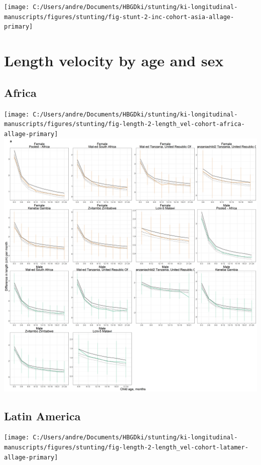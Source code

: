\documentclass[9pt,]{book}
\begin{document}
\texttt{[image: C:/Users/andre/Documents/HBGDki/stunting/ki-longitudinal-manuscripts/figures/stunting/fig-stunt-2-inc-cohort-asia-allage-primary]}

\section{Length velocity by age and
sex}\label{length-velocity-by-age-and-sex}

\subsection{Africa}\label{africa-3}

\texttt{[image: C:/Users/andre/Documents/HBGDki/stunting/ki-longitudinal-manuscripts/figures/stunting/fig-length-2-length\_vel-cohort-africa-allage-primary]}
\includegraphics[width=75in]{figure-copies/fig-length-2-length_vel-cohort-africa-allage-primary}

\subsection{Latin America}\label{latin-america-3}

\texttt{[image: C:/Users/andre/Documents/HBGDki/stunting/ki-longitudinal-manuscripts/figures/stunting/fig-length-2-length\_vel-cohort-latamer-allage-primary]}
\end{document}
